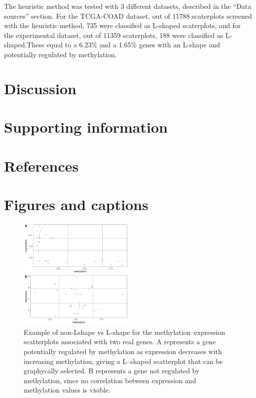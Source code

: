\documentclass[10pt,letterpaper]{article}
\begin{document}
The heuristic method was tested with 3 different datasets, described in
the ``Data sources'' section. For the TCGA-COAD dataset, out of 11788
scaterplots screened with the heuristic method, 735 were classified as
L-shaped scaterplots, and for the experimental dataset, out of 11359
scaterplots, 188 were classified as L-shaped.These equal to a 6.23\% and
a 1.65\% genes with an L-shape and potentially regulated by methylation.

\hypertarget{discussion}{%
\section{Discussion}\label{discussion}}

\hypertarget{supporting-information}{%
\section{Supporting information}\label{supporting-information}}

\hypertarget{references}{%
\section*{References}\label{references}}

\hypertarget{figures-and-captions}{%
\section{Figures and captions}\label{figures-and-captions}}

\begin{figure}
\hypertarget{id}{%
\centering
\includegraphics[width=0.5\textwidth,height=0.5\textheight]{figures/Figure1.png}
\caption{Example of non-Lshape vs L-shape for the
methylation--expression scatterplots associated with two real genes. A
represents a gene potentially regulated by methylation as expression
decreases with increasing methylation, giving a L--shaped scatterplot
that can be graphycally selected. B represents a gene not regulated by
methylation, since no correlation between expression and methylation
values is visible.}\label{id}
}
\end{figure}
\end{document}
